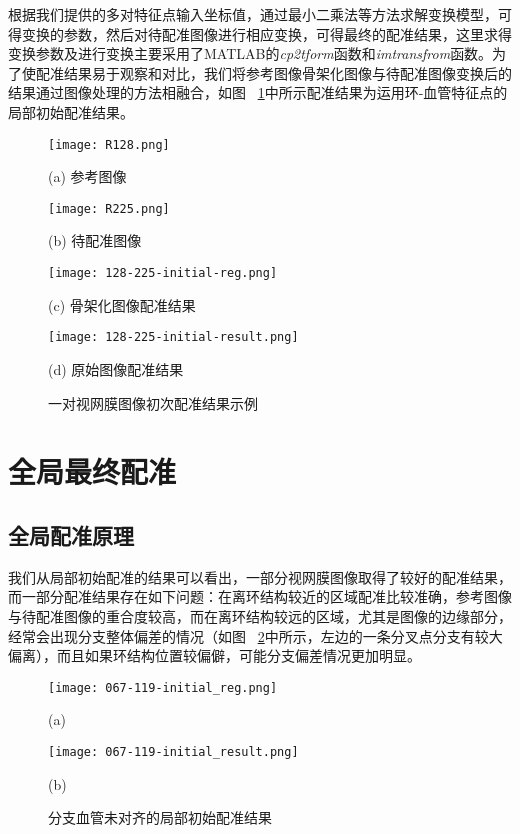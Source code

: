 根据我们提供的多对特征点输入坐标值，通过最小二乘法等方法求解变换模型，可得变换的参数，然后对待配准图像进行相应变换，可得最终的配准结果，这里求得变换参数及进行变换主要采用了MATLAB的\emph{cp2tform}函数和\emph{imtransfrom}函数。为了使配准结果易于观察和对比，我们将参考图像骨架化图像与待配准图像变换后的结果通过图像处理的方法相融合，如图 ~\ref{initial}中所示配准结果为运用环-血管特征点的局部初始配准结果。
\begin{figure}[ht!]
  \centering
  \begin{minipage}[b]{0.45\linewidth} 
  \centering
  \texttt{[image: R128.png]}
  \centerline{(a) 参考图像}\medskip
    \end{minipage}
\begin{minipage}[b]{0.45\linewidth}
  \centering
  \texttt{[image: R225.png]}
 \centerline{(b) 待配准图像}\medskip
   \end{minipage}  
  \begin{minipage}[b]{0.45\linewidth}
    \centering
  \texttt{[image: 128-225-initial-reg.png]}
 \centerline{(c) 骨架化图像配准结果}\medskip
   \end{minipage}  
  \begin{minipage}[b]{0.45\linewidth}
    \centering
  \texttt{[image: 128-225-initial-result.png]}
   \centerline{(d) 原始图像配准结果}\medskip
   \end{minipage}  
  \caption{一对视网膜图像初次配准结果示例}
    \label{initial}
 \end{figure}

\section{全局最终配准}
\subsection{全局配准原理}
我们从局部初始配准的结果可以看出，一部分视网膜图像取得了较好的配准结果，而一部分配准结果存在如下问题：在离环结构较近的区域配准比较准确，参考图像与待配准图像的重合度较高，而在离环结构较远的区域，尤其是图像的边缘部分，经常会出现分支整体偏差的情况（如图 ~\ref{unalign}中所示，左边的一条分叉点分支有较大偏离），而且如果环结构位置较偏僻，可能分支偏差情况更加明显。
 \begin{figure}[ht!]
  \centering
  \begin{minipage}[b]{0.45\linewidth} 
      \centering 
  \texttt{[image: 067-119-initial\_reg.png]}
        \centerline{(a)}\medskip
    \end{minipage}
  \begin{minipage}[b]{0.45\linewidth} 
      \centering 
  \texttt{[image: 067-119-initial\_result.png]}
    \centerline{(b)}\medskip
      \end{minipage}
  \caption{分支血管未对齐的局部初始配准结果}
    \label{unalign}
 \end{figure}

